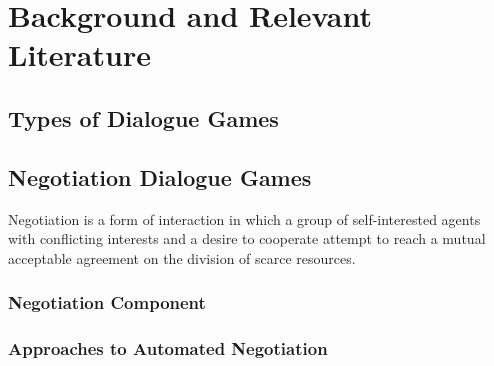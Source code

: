\setcounter{chapter}{1}

\chapter{Background and Relevant Literature}\label{sec:MAS}





\section{Types of Dialogue Games}\label{sec:DialogueGames}






\section{Negotiation Dialogue Games}\label{sec:Negotiation}
Negotiation is a form of interaction in which a group of self-interested agents with conflicting interests and a desire to cooperate attempt to
reach  a mutual acceptable agreement on the division of scarce resources.



   \subsection{Negotiation Component}\label{sec:NComp}




   \subsection{Approaches to Automated Negotiation}\label{sec:Nappro}


